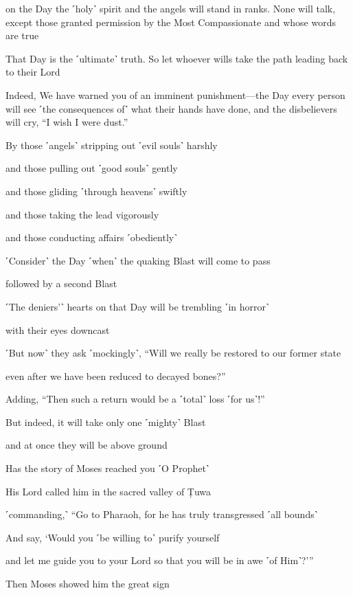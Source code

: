 on the Day the ˹holy˺ spirit and the angels will stand in ranks. None will talk, except those granted permission by the Most Compassionate and whose words are true

That Day is the ˹ultimate˺ truth. So let whoever wills take the path leading back to their Lord

Indeed, We have warned you of an imminent punishment—the Day every person will see ˹the consequences of˺ what their hands have done, and the disbelievers will cry, “I wish I were dust.”

By those ˹angels˺ stripping out ˹evil souls˺ harshly

and those pulling out ˹good souls˺ gently

and those gliding ˹through heavens˺ swiftly

and those taking the lead vigorously

and those conducting affairs ˹obediently˺

˹Consider˺ the Day ˹when˺ the quaking Blast will come to pass

followed by a second Blast

˹The deniers’˺ hearts on that Day will be trembling ˹in horror˺

with their eyes downcast

˹But now˺ they ask ˹mockingly˺, “Will we really be restored to our former state

even after we have been reduced to decayed bones?”

Adding, “Then such a return would be a ˹total˺ loss ˹for us˺!”

But indeed, it will take only one ˹mighty˺ Blast

and at once they will be above ground

Has the story of Moses reached you ˹O Prophet˺

His Lord called him in the sacred valley of Ṭuwa

˹commanding,˺ “Go to Pharaoh, for he has truly transgressed ˹all bounds˺

And say, ‘Would you ˹be willing to˺ purify yourself

and let me guide you to your Lord so that you will be in awe ˹of Him˺?’”

Then Moses showed him the great sign

